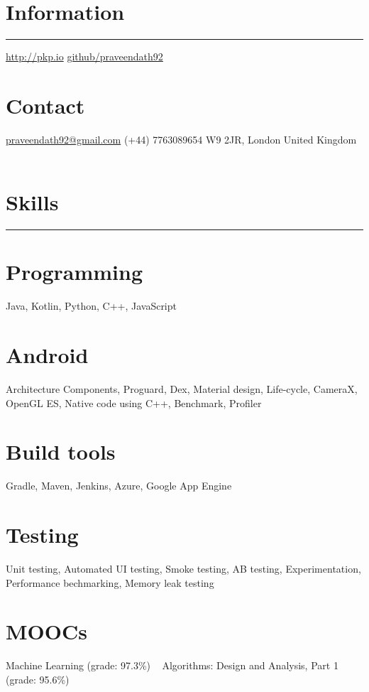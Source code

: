 \documentclass[]{friggeri-cv}
\begin{document}

\begin{aside}
    \section{Information}
        \noindent\rule{3cm}{0.5pt}
        \href{http://pkp.io}{http://pkp.io}
        \href{https://github.com/praveendath92}{github/praveendath92}
    \section{Contact}
        \href{mailto:praveendath92@gmail.com}{praveendath92@gmail.com}
        (+44) 7763089654
        W9 2JR, London
        United Kingdom
    ~
    \section{Skills}
        \noindent\rule{3cm}{0.5pt}
    \section{Programming}
        Java, Kotlin, Python, C++, JavaScript
    \section{Android}
        Architecture Components, Proguard, Dex, Material design, Life-cycle, CameraX, OpenGL ES, Native code using C++, Benchmark, Profiler
    \section{Build tools}
        Gradle, Maven, Jenkins, Azure, Google App Engine
    \section{Testing}
        Unit testing, Automated UI testing, Smoke testing, AB testing, Experimentation, Performance bechmarking, Memory leak testing
    \section{MOOCs}
        Machine Learning 
        (grade: 97.3\%)
        ~
        Algorithms: Design and Analysis, Part 1 
        (grade: 95.6\%)
\end{aside}
~
\end{document}

